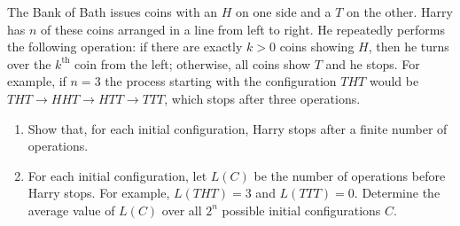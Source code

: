 The Bank of Bath issues coins with an $H$ on one side and a $T$ on the other. Harry has $n$ of these coins arranged in a line from left to right. He repeatedly performs the following operation: if there are exactly $k>0$ coins showing $H$, then he turns over the $k^{\text{th}}$ coin from the left; otherwise, all coins show $T$ and he stops. For example, if $n=3$ the process starting with the configuration $THT$ would be $THT\to HHT\to HTT\to TTT$, which stops after three operations.
\begin{enumerate}[label=(\alph*)]
	\item Show that, for each initial configuration, Harry stops after a finite number of operations.
	\item For each initial configuration, let $L(C)$ be the number of operations before Harry stops. For example, $L(THT)=3$ and $L(TTT)=0$. Determine the average value of $L(C)$ over all $2^n$ possible initial configurations $C$.
\end{enumerate}